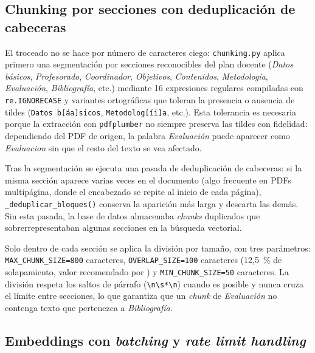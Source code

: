 \subsection{Chunking por secciones con deduplicación de cabeceras}

El troceado no se hace por número de caracteres ciego: \texttt{chunking.py} aplica primero una segmentación por secciones reconocibles del plan docente (\textit{Datos básicos}, \textit{Profesorado}, \textit{Coordinador}, \textit{Objetivos}, \textit{Contenidos}, \textit{Metodología}, \textit{Evaluación}, \textit{Bibliografía}, etc.) mediante 16 expresiones regulares compiladas con \texttt{re.IGNORECASE} y variantes ortográficas que toleran la presencia o ausencia de tildes (\texttt{Datos~b[áa]sicos}, \texttt{Metodolog[íi]a}, etc.). Esta tolerancia es necesaria porque la extracción con \texttt{pdfplumber} no siempre preserva las tildes con fidelidad: dependiendo del PDF de origen, la palabra \textit{Evaluación} puede aparecer como \textit{Evaluacion} sin que el resto del texto se vea afectado.

Tras la segmentación se ejecuta una pasada de deduplicación de cabeceras: si la misma sección aparece varias veces en el documento (algo frecuente en PDFs multipágina, donde el encabezado se repite al inicio de cada página), \texttt{\_deduplicar\_bloques()} conserva la aparición más larga y descarta las demás. Sin esta pasada, la base de datos almacenaba \textit{chunks} duplicados que sobrerrepresentaban algunas secciones en la búsqueda vectorial.

Solo dentro de cada sección se aplica la división por tamaño, con tres parámetros: \texttt{MAX\_CHUNK\_SIZE=800} caracteres, \texttt{OVERLAP\_SIZE=100} caracteres (12,5~\% de solapamiento, valor recomendado por \cite{langchainChunking}) y \texttt{MIN\_CHUNK\_SIZE=50} caracteres. La división respeta los saltos de párrafo (\texttt{\textbackslash n\textbackslash s*\textbackslash n}) cuando es posible y nunca cruza el límite entre secciones, lo que garantiza que un \textit{chunk} de \textit{Evaluación} no contenga texto que pertenezca a \textit{Bibliografía}.

\subsection{Embeddings con \textit{batching} y \textit{rate limit handling}}

